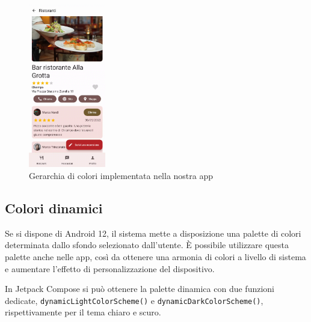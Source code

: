 \documentclass[12pt, a4paper]{report}
\begin{document}
		\begin{figure}[h]
   			\centering
   			\includegraphics[width=0.3\textwidth]{gerarchia_colori} %
 			\caption{Gerarchia di colori implementata nella nostra app}
 			\label{gerarchia_colori}
		\end{figure}
		
		\subsection{Colori dinamici}
		Se si dispone di Android 12, il sistema mette a disposizione una palette di colori determinata dallo sfondo selezionato dall'utente. È possibile utilizzare questa palette anche nelle app, così da ottenere una armonia di colori a livello di sistema e aumentare l'effetto di personalizzazione del dispositivo.
		
		In Jetpack Compose si può ottenere la palette dinamica con due funzioni dedicate, \texttt{dynamicLightColorScheme()} e \texttt{dynamicDarkColorScheme()}, rispettivamente per il tema chiaro e scuro.
		
\end{document}
